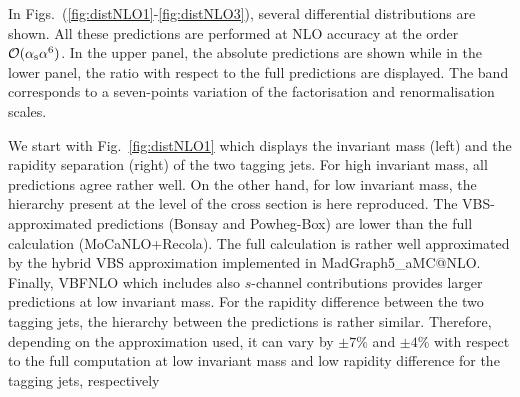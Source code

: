In Figs.~(\ref{fig:distNLO1}-\ref{fig:distNLO3}), several differential distributions are shown.
All these predictions are performed at NLO accuracy at the order $\mathcal{O}(\alpha_\text{s}\alpha^6)$.
In the upper panel, the absolute predictions are shown while in the lower panel, the ratio with respect to the full predictions are displayed.
The band corresponds to a seven-points variation of the factorisation and renormalisation scales.

We start with Fig.~\ref{fig:distNLO1} which displays the invariant mass (left) and the rapidity separation (right) of the two tagging jets.
For high invariant mass, all predictions agree rather well.
On the other hand, for low invariant mass, the hierarchy present at the level of the cross section is here reproduced.
The VBS-approximated predictions ({\sc Bonsay} and {\sc Powheg-Box}) are lower than the full calculation ({\sc MoCaNLO}+{\sc Recola}).
The full calculation is rather well approximated by the hybrid VBS approximation implemented in {\sc MadGraph5\_aMC\-@NLO}.
Finally, {\sc VBFNLO} which includes also $s$-channel contributions provides larger predictions at low invariant mass.
For the rapidity difference between the two tagging jets, the hierarchy between the predictions is rather similar.
Therefore, depending on the approximation used, it can vary by $\pm7\%$ and $\pm4\%$ with respect to the full computation at low invariant mass and low rapidity difference for the tagging jets, respectively

